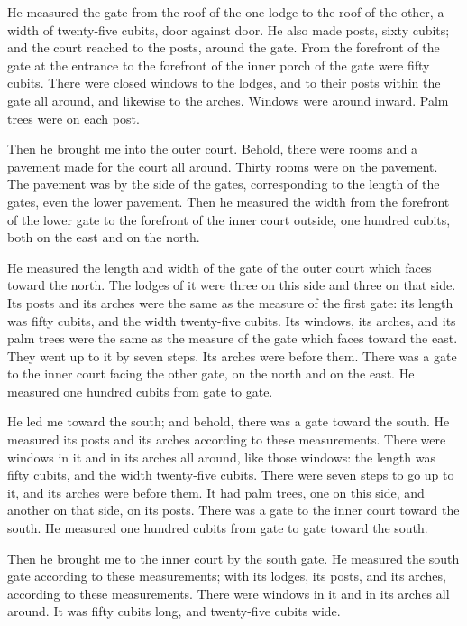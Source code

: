 {He measured the gate from the roof of the one lodge to the roof of the other, a width of twenty-five cubits, door against door.
He also made posts, sixty cubits; and the court reached to the posts, around the gate.
From the forefront of the gate at the entrance to the forefront of the inner porch of the gate were fifty cubits.
There were closed windows to the lodges, and to their posts within the gate all around, and likewise to the arches. Windows were around inward. Palm trees were on each post.
\par }{\PP {}Then he brought me into the outer court. Behold, there were rooms and a pavement made for the court all around. Thirty rooms were on the pavement.
The pavement was by the side of the gates, corresponding to the length of the gates, even the lower pavement.
Then he measured the width from the forefront of the lower gate to the forefront of the inner court outside, one hundred cubits, both on the east and on the north.
\par }{\PP {}He measured the length and width of the gate of the outer court which faces toward the north.
The lodges of it were three on this side and three on that side. Its posts and its arches were the same as the measure of the first gate: its length was fifty cubits, and the width twenty-five cubits.
Its windows, its arches, and its palm trees were the same as the measure of the gate which faces toward the east. They went up to it by seven steps. Its arches were before them.
There was a gate to the inner court facing the other gate, on the north and on the east. He measured one hundred cubits from gate to gate.
\par }{\PP {}He led me toward the south; and behold, there was a gate toward the south. He measured its posts and its arches according to these measurements.
There were windows in it and in its arches all around, like those windows: the length was fifty cubits, and the width twenty-five cubits.
There were seven steps to go up to it, and its arches were before them. It had palm trees, one on this side, and another on that side, on its posts.
There was a gate to the inner court toward the south. He measured one hundred cubits from gate to gate toward the south.
\par }{\PP {}Then he brought me to the inner court by the south gate. He measured the south gate according to these measurements;
with its lodges, its posts, and its arches, according to these measurements. There were windows in it and in its arches all around. It was fifty cubits long, and twenty-five cubits wide.
}
